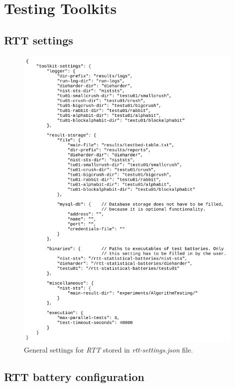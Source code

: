 \documentclass[
  digital,     %
  oneside,     %
  nosansbold,  %
  nocolorbold, %
  nolof,         %
  nolot,         %
]{fithesis4}
\begin{document}
\chapter{Testing Toolkits} \label{append:rtt}

\section{RTT settings}

\begin{figure}[H]
  \begin{center}
    \includegraphics[width=11cm]{figures/rtt/rtt-settings.jpg}
  \end{center}
  \caption{General settings for \emph{RTT} stored in \emph{rtt-settings.json} file.}
  \label{fig:rtt_settings}
\end{figure}



\section{RTT battery configuration} \label{append:rtt-setting}
\end{document}
